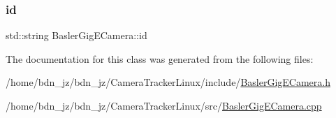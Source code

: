 \mbox{\label{class_basler_gig_e_camera_a1f2a44906ddb75d4fa3b0d37bc6a131e}} 
\subsubsection{\texorpdfstring{id}{id}}
{\footnotesize\ttfamily std\+::string Basler\+Gig\+E\+Camera\+::id\hspace{0.3cm}{\ttfamily [private]}}



The documentation for this class was generated from the following files\+:\begin{DoxyCompactItemize}
\item 
/home/bdn\+\_\+jz/bdn\+\_\+jz/\+Camera\+Tracker\+Linux/include/\hyperlink{_basler_gig_e_camera_8h}{Basler\+Gig\+E\+Camera.\+h}\item 
/home/bdn\+\_\+jz/bdn\+\_\+jz/\+Camera\+Tracker\+Linux/src/\hyperlink{_basler_gig_e_camera_8cpp}{Basler\+Gig\+E\+Camera.\+cpp}\end{DoxyCompactItemize}
